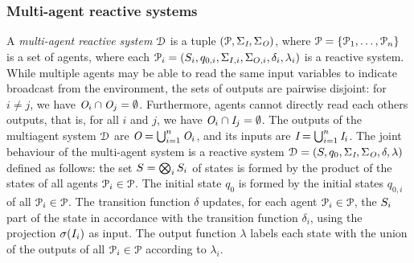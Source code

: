 \iffalse
\subsubsection*{Serial composition of reactive systems}
Consider two reactive systems  $\proc = (\states,q_{0},\ialphabet,\oalphabet,\delta,\lambda)$ and $\shield = (\states', q_{0}',\ialphabet\times\oalphabet, \oalphabet,\delta',\lambda')$.
The \emph{serial composition} of $\proc$ and $\shield$ is obtained by feeding the input and output of $\proc$ to $\shield$ and results in a new reactive system $\proc \comp \shield=(\hat{\states}, \hat{q_{0}}, \ialphabet,\oalphabet, \hat{\delta},
\hat{\lambda})$, where
   $\hat{\states} = \states \times \states'$,
   $\hat{q_{0}} = (q_{0}, q_{0}')$,
   $\hat{\delta}((q,q'),\isymb) = (\delta(q,\isymb), \delta'(q',(\isymb,\lambda(q,\isymb))))$, and
   $\hat{\lambda}((q,q'),\isymb) = \lambda'(q',(\isymb,\lambda(q, \isymb)))$.
\fi
   
\subsubsection*{Multi-agent reactive systems}
A \emph{multi-agent reactive system} $\mathcal{D}$ is a tuple $(\mathcal{P}, \Sigma_{\textit{I}},  \Sigma_{\textit{O}})$, where $\mathcal{P} = \{\mathcal{P}_1,\ldots,\mathcal{P}_n\}$ is a set of agents, where each $\mathcal{P}_i = (S_i, q_{0,i},\Sigma_{I,i},\Sigma_{O,i},\delta_i,\lambda_i)$ is a reactive system.
%
While multiple agents may be able to read the same input variables to indicate
broadcast from the environment, the sets of outputs are pairwise disjoint: for $i \neq j$, we have $\textit{O}_i \cap \textit{O}_j = \emptyset$. Furthermore, agents cannot directly read each others outputs, that is, for all $i$ and $j$, we have $\textit{O}_i \cap \textit{I}_j = \emptyset$. The outputs of the multiagent system  $\mathcal{D}$ are $\textit{O} = \bigcup_{i=1}^n \textit{O}_i$, and its inputs are $\textit{I}  = \bigcup_{i=1}^n \textit{I}_i$.
%
The joint behaviour of the multi-agent system is a reactive system 
$\mathcal{D}=(S, q_{0}, \Sigma_{\textit{I}},\Sigma_{\textit{O}}, \delta,
\lambda)$ defined as follows: the set $S = \bigotimes_i S_i$ of states is formed by the product of
the states of all agents $\mathcal{P}_i \in \mathcal{P}$. The initial state $q_{0}$ is formed
by the initial states $q_{0,i}$ of all $\mathcal{P}_i \in \mathcal{P}$. The transition function $\delta$ updates, for each agent $\mathcal{P}_i \in \mathcal{P}$, the $S_i$ part of the state in accordance with the transition function $\delta_i$, using
the projection $\sigma(I_i)$ as input. The output function $\lambda$ labels each state with the
union of the outputs of all $\mathcal{P}_i \in \mathcal{P}$ according to $\lambda_i$.



